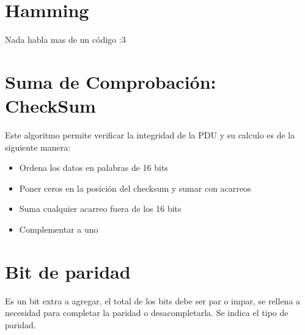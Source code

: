 \documentclass[12pt, fleqn]{report}                             %
\theoremstyle{break}                                            %
\begin{document}
        \clearpage
        \section{Hamming}

            Nada habla mas de un código :3

            

        


    
        \clearpage
        \section{Suma de Comprobación: CheckSum}

            Este algoritmo permite verificar la integridad de la PDU y su calculo es de la siguiente manera:

            \begin{itemize}
                \item Ordena los datos en palabras de 16 bits
                \item Poner ceros en la posición del checksum y sumar con acarreos
                \item Suma cualquier acarreo fuera de los 16 bits
                \item Complementar a uno
            \end{itemize}





        \section{Bit de paridad}
        Es un bit extra a agregar, el total de los bits debe ser par o impar, se rellena a necesidad para completar la paridad o desacompletarla.
        Se indica el tipo de paridad.
\end{document}
